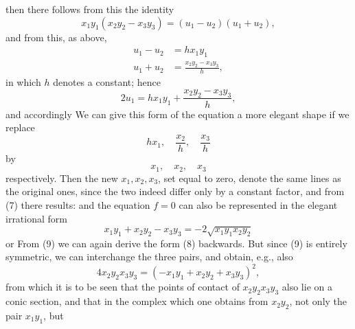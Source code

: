 then there follows from this the identity
\[
x_1 y_1 (x_2 y_2 - x_3 y_3) = (u_1 - u_2)(u_1 + u_2),
\]
and from this, as above,
\[
\begin{aligned}
u_1 - u_2 &= h x_1 y_1\\
u_1 + u_2 &= \frac{x_2 y_2 - x_3 y_3}{h},
\end{aligned}
\]
in which $h$ denotes a constant; hence
\[
2u_1 = h x_1 y_1 + \frac{x_2 y_2 - x_3 y_3}{h},
\]
and accordingly
We can give this form of the equation a more elegant shape if we replace
\[
h x_1,\quad \frac{x_2}{h},\quad \frac{x_3}{h}
\]
by
\[
x_1,\quad x_2,\quad x_3
\]
respectively. Then the new $x_1, x_2, x_3$, set equal to zero, denote the same lines as the original ones, since the two indeed differ only by a constant factor, and from (7) there results:
and the equation $f = 0$ can also be represented in the elegant irrational form
\[
x_1 y_1 + x_2 y_2 - x_3 y_3 = -2\sqrt{x_1 y_1 x_2 y_2}
\]
or
From (9) we can again derive the form (8) backwards. But since (9) is entirely symmetric, we can interchange the three pairs, and obtain, e.g., also
\[
4 x_2 y_2 x_3 y_3 = (-x_1 y_1 + x_2 y_2 + x_3 y_3)^2,
\]
from which it is to be seen that the points of contact of $x_2 y_2 x_3 y_3$ also lie on a conic section, and that in the complex which one obtains from $x_2 y_2$, not only the pair $x_1 y_1$, but
